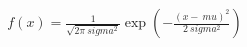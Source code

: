 \documentclass[preview]{standalone}
\begin{document}
\begin{align*}
f(x) = \frac{1}{\sqrt{2 \pi \ sigma ^2}} \exp\left(-\frac{(x - \ mu )^2}{2 \ sigma ^2}\right)
\end{align*}
\end{document}
